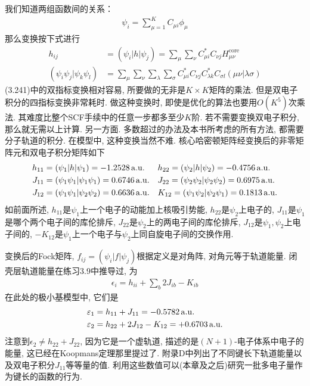 我们知道两组函数间的关系：
\begin{align}
	\psi_i = \sum_{\mu=1}^{K}C_{\mu i}\phi_\mu
\end{align}
那么变换按下式进行
\begin{align}
	h_{ij} & = (\psi_i|h|\psi_j) = \sum_{\mu}\sum_{\nu}C_{\mu i}^*C_{\nu j}H_{\mu\nu}^\mathrm{core}\\
	(\psi_i\psi_j|\psi_k\psi_l) & = \sum_\mu\sum_\nu\sum_\lambda\sum_\sigma C_{\mu i}^*C_{\nu j}C_{\lambda k}^*C_{\sigma l}(\mu\nu|\lambda\sigma)
\end{align}
(3.241)中的双指标变换相对容易, 所要做的无非是$K\times K$矩阵的乘法. 
但是双电子积分的四指标变换非常耗时. 做这种变换时, 即使是优化的算法也要用$O(K^5)$次乘法. 其难度比整个SCF手续中的任意一步都多至少$K$阶. 
若不需要变换双电子积分, 那么就无需以上计算. 另一方面. 多数超过\hft 的办法及本书所考虑的所有方法, 都需要分子轨道的积分. 
在模型中, 这种变换当然不难. 
核心哈密顿矩阵经变换后的非零矩阵元和双电子积分矩阵如下
\begin{align*}
	h_{11} & =(\psi_1|h|\psi_1)=-1.2528\,\mathrm{a.u.}          &  & h_{22}=(\psi_2|h|\psi_2)=-0.4756\,\mathrm{a.u.}          \\
	J_{11} & =(\psi_1\psi_1|\psi_1\psi_1)=0.6746\,\mathrm{a.u.} &  & J_{22}=(\psi_2\psi_2|\psi_2\psi_2)=0.6975\,\mathrm{a.u.} \\
	J_{12} & =(\psi_1\psi_1|\psi_2\psi_2)=0.6636\,\mathrm{a.u.} &  & K_{12}=(\psi_1\psi_2|\psi_2\psi_1)=0.1813\,\mathrm{a.u.}
\end{align*}
如前面所述, 
$h_{11}$是$\psi_1$上一个电子的动能加上核吸引势能, 
$h_{22}$是$\psi_2$上电子的, 
$J_{11}$是$\psi_1$是哪个两个电子间的库伦排斥, 
$J_{22}$是$\psi_2$上的两电子间的库伦排斥, 
$J_{12}$是$\psi_1,\psi_2$上电子间的, 
$-K_{12}$是$\psi_1$上一个电子与$\psi_2$上同自旋电子间的交换作用.


变换后的Fock矩阵, 
$f_{ij}=(\psi_i|f|\psi_j)$根据定义是对角阵, 
对角元等于轨道能量. 
闭壳层轨道能量在练习3.9中推导过, 
为
\begin{align}
	\epsilon_i = h_{ii} + \sum_b2J_{ib} -K_{ib}
\end{align}
在此处的极小基模型中, 
它们是
\begin{align}
	\varepsilon_1 & = h_{11} + J_{11} = -0.5782\,\mathrm{a.u.}\\
	\varepsilon_2 & = h_{22} + 2J_{12} - K_{12} = +0.6703\,\mathrm{a.u.}
\end{align}
注意到$\epsilon_2\neq h_{22}+J_{22}$, 
因为它是一个虚轨道, 
描述的是$(N+1)$-电子体系中电子的能量, 
这已经在Koopmans定理那里提过了. 
附录D中列出了不同键长下轨道能量以及双电子积分$J_{11}$等等量的值. 
利用这些数值可以(本章及之后)研究一批多电子量作为键长的函数的行为.


